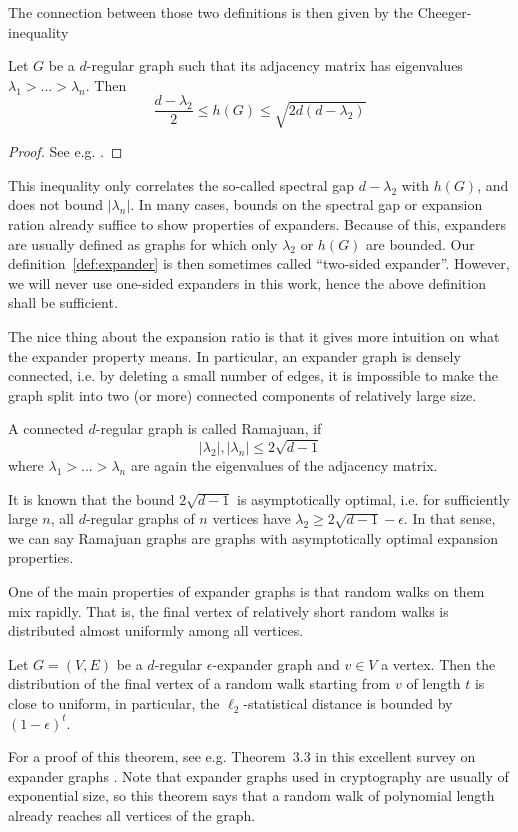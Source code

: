 The connection between those two definitions is then given by the Cheeger-inequality
\begin{prop}
    Let $G$ be a $d$-regular graph such that its adjacency matrix has eigenvalues $\lambda_1 > ... > \lambda_n$.
    Then
    \begin{equation*}
        \frac {d - \lambda_2} 2 \leq h(G) \leq \sqrt{2d(d - \lambda_2)}
    \end{equation*}
\end{prop}
\begin{proof}
    See e.g. \cite{cheeger_inequality}.
\end{proof}
This inequality only correlates the so-called spectral gap $d - \lambda_2$ with $h(G)$, and does not bound $|\lambda_n|$.
In many cases, bounds on the spectral gap or expansion ration already suffice to show properties of expanders.
Because of this, expanders are usually defined as graphs for which only $\lambda_2$ or $h(G)$ are bounded.
Our definition~\ref{def:expander} is then sometimes called ``two-sided expander''.
However, we will never use one-sided expanders in this work, hence the above definition shall be sufficient.

The nice thing about the expansion ratio is that it gives more intuition on what the expander property means.
In particular, an expander graph is densely connected, i.e. by deleting a small number of edges, it is impossible to make the graph split into two (or more) connected components of relatively large size.
\begin{definition}
    A connected $d$-regular graph is called Ramajuan, if
    \begin{equation*}
        |\lambda_2|, |\lambda_n| \leq 2\sqrt{d - 1}
    \end{equation*}
    where $\lambda_1 > ... > \lambda_n$ are again the eigenvalues of the adjacency matrix.
\end{definition}
It is known that the bound $2\sqrt{d - 1}$ is asymptotically optimal, i.e. for sufficiently large $n$, all $d$-regular graphs of $n$ vertices have $\lambda_2 \geq 2\sqrt{d - 1} - \epsilon$.
In that sense, we can say Ramajuan graphs are graphs with asymptotically optimal expansion properties.

One of the main properties of expander graphs is that random walks on them mix rapidly.
That is, the final vertex of relatively short random walks is distributed almost uniformly among all vertices.
\begin{theorem}
    \label{prop:expander_random_walk}
    Let $G = (V, E)$ be a $d$-regular $\epsilon$-expander graph and $v \in V$ a vertex.
    Then the distribution of the final vertex of a random walk starting from $v$ of length $t$ is close to uniform, in particular, the $\ell_2$-statistical distance is bounded by $(1 - \epsilon)^t$.
\end{theorem}
For a proof of this theorem, see e.g. Theorem~3.3 in this excellent survey on expander graphs \cite{expander_survey}.
Note that expander graphs used in cryptography are usually of exponential size, so this theorem says that a random walk of polynomial length already reaches all vertices of the graph.

